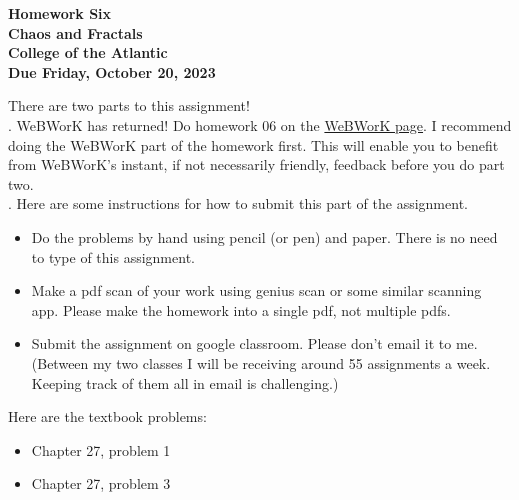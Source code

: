\documentclass[12pt]{article}
\begin{document}
\pagestyle{empty}
 
\begin{center}
{\LARGE {\bf Homework Six}}\\
\bigskip
{\Large {\bf Chaos and Fractals}}\\
\bigskip
{\Large {\bf College of the Atlantic}}\\
\bigskip
{ {\bf Due Friday, October 20, 2023}}\\  
\end{center}
\medskip

\noindent There are two parts to this assignment!\\

. WeBWorK has returned! Do homework 06
on the 
\href{https://webwork-hosting.runestone.academy/webwork2/coa-feldman-es1026i-fall2023}{WeBWorK page}.  I recommend doing the WeBWorK part of the 
homework first.  This will enable you to benefit from WeBWorK's
instant, if not necessarily friendly, feedback before you do part two.\\

.  Here are some
instructions for how to submit this part of the assignment. 
\begin{itemize}
\item Do the problems by hand using pencil (or pen) and paper.
  There is no need to type of this assignment.
\item Make a pdf scan of your work using genius scan or some
  similar scanning app.  Please make the homework into a single
  pdf, not multiple pdfs.
\item Submit the assignment on google classroom.  Please don't
  email it to me.  (Between my two classes I will be receiving
  around 55 assignments a week.  Keeping track of them all in email
  is challenging.)
\end{itemize}

\noindent Here are the textbook problems:\\

\begin{itemize}
\setlength{\itemsep}{-1mm}
\item Chapter 27, problem 1
\item Chapter 27, problem 3
\end{itemize}
\end{document}
